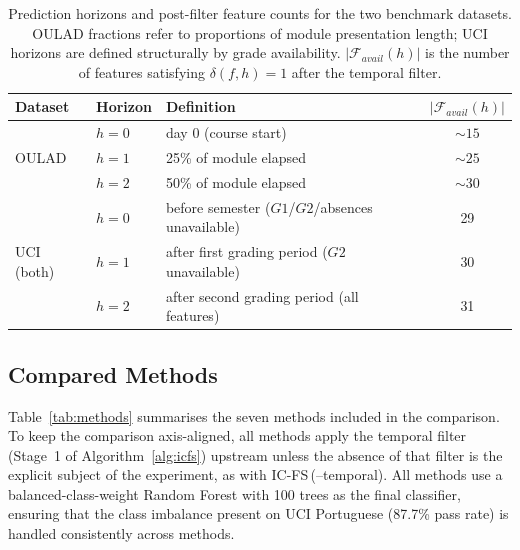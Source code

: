 \documentclass[a4paper,fleqn]{cas-sc}
\begin{document}
\begin{table}[t]
\caption{Prediction horizons and post-filter feature counts for the two
  benchmark datasets. OULAD fractions refer to proportions of module presentation length; UCI horizons are defined structurally by grade availability. $|\mathcal{F}_{avail}(h)|$ is the number of features satisfying $\delta(f,h)=1$ after the temporal filter.}
\label{tab:horizons}
\centering
\renewcommand{\arraystretch}{1.18}
\begin{tabular}{l l l c}
\toprule
\textbf{Dataset} & \textbf{Horizon} & \textbf{Definition}
                 & $|\mathcal{F}_{avail}(h)|$ \\
\midrule
\multirow{3}{*}{OULAD}
  & $h=0$ & day 0 (course start)         & ${\sim}15$ \\
  & $h=1$ & 25\% of module elapsed        & ${\sim}25$ \\
  & $h=2$ & 50\% of module elapsed        & ${\sim}30$ \\
\midrule
\multirow{3}{*}{UCI (both)}
  & $h=0$ & before semester ($G1$/$G2$/absences unavailable) & 29 \\
  & $h=1$ & after first grading period ($G2$ unavailable)    & 30 \\
  & $h=2$ & after second grading period (all features)       & 31 \\
\bottomrule
\end{tabular}
\end{table}
 
\subsection{Compared Methods}
\label{sec:exp:methods}
 
Table~\ref{tab:methods} summarises the seven methods included in the comparison. To keep the comparison axis-aligned, all methods apply the temporal filter (Stage~1 of Algorithm~\ref{alg:icfs}) upstream unless the absence of that filter is the explicit subject of the experiment, as with IC-FS\,(--temporal). All methods use a balanced-class-weight Random Forest with 100 trees as the final classifier, ensuring that the class imbalance present on UCI Portuguese (87.7\% pass rate) is handled consistently across methods.
 
\end{document}
